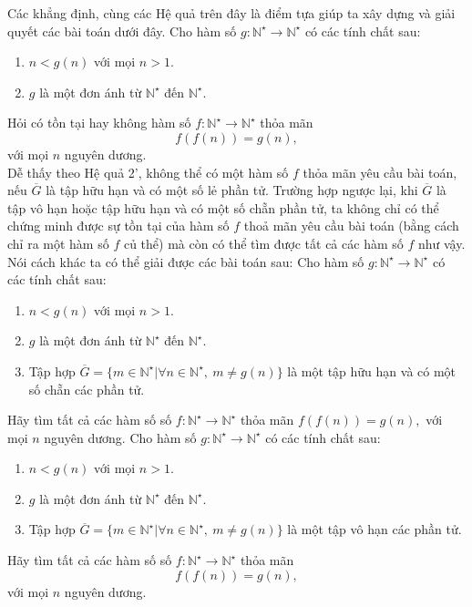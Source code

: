 Các khẳng định, cùng các Hệ quả trên đây là điểm tựa giúp ta xây dựng và giải quyết các bài toán dưới đây.
\bt Cho hàm số $g: \mathbb{N}^\star\longrightarrow\mathbb{N}^\star$ có các tính chất sau:
\begin{enumerate}[i/]
	\item $n<g(n)$ với mọi $n>1$.
	\item $g$ là một đơn ánh từ $\mathbb{N}^\star$ đến $\mathbb{N}^\star$.
	
\end{enumerate}
Hỏi có tồn tại hay không hàm số $f: \mathbb{N}^\star\longrightarrow\mathbb{N}^\star$ thỏa mãn 
$$f(f(n))=g(n),$$
với mọi $n$ nguyên dương.\\
Dễ thấy theo Hệ quả 2', không thể có một hàm số $f$ thỏa mãn yêu cầu bài toán, nếu $\overline{G}$ là tập hữu hạn và có một số lẻ phần tử. Trường hợp ngược lại, khi $\overline{G}$ là tập vô hạn hoặc tập hữu hạn và có một số chẵn phần tử, ta không chỉ có thể chứng minh được sự tồn tại của hàm số $f$ thoả mãn yêu cầu bài toán (bằng cách chỉ ra một hàm số $f$ củ thể) mà  còn có thể tìm được tất cả các hàm số $f$ như vậy. Nói cách khác ta có thể giải được các bài toán sau:
\bt Cho hàm số $g: \mathbb{N}^\star\longrightarrow\mathbb{N}^\star$ có các tính chất sau:
\begin{enumerate}[i/]
	\item $n<g(n)$ với mọi $n>1$.
	\item $g$ là một đơn ánh từ $\mathbb{N}^\star$ đến $\mathbb{N}^\star$.
	\item Tập hợp $\overline{G}=\{m\in\mathbb{N}^\star| \forall n\in\mathbb{N}^\star,\ m\ne g(n)\}$ là một tập hữu hạn và có một số chẵn các phần tử.
\end{enumerate}
Hãy tìm tất cả các hàm số số $f: \mathbb{N}^\star\longrightarrow\mathbb{N}^\star$ thỏa mãn $f(f(n))=g(n),$ với mọi $n$ nguyên dương.
\bt Cho hàm số $g: \mathbb{N}^\star\longrightarrow\mathbb{N}^\star$ có các tính chất sau:
\begin{enumerate}[i/]
	\item $n<g(n)$ với mọi $n>1$.
	\item $g$ là một đơn ánh từ $\mathbb{N}^\star$ đến $\mathbb{N}^\star$.
	\item Tập hợp $\overline{G}=\{m\in\mathbb{N}^\star| \forall n\in\mathbb{N}^\star,\ m\ne g(n)\}$ là một tập vô hạn các phần tử.
\end{enumerate}
Hãy tìm tất cả các hàm số số $f: \mathbb{N}^\star\longrightarrow\mathbb{N}^\star$ thỏa mãn $$f(f(n))=g(n),$$ với mọi $n$ nguyên dương.

